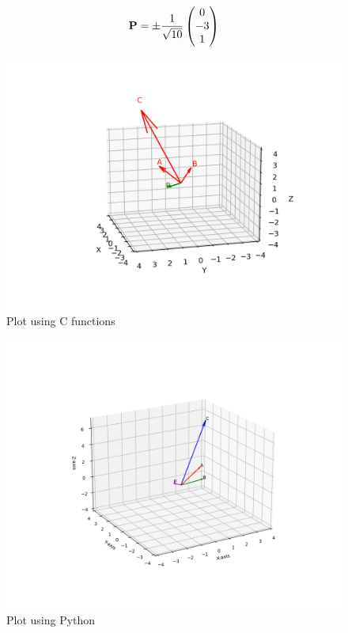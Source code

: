 \documentclass{beamer}
\numberwithin{equation}{section}
\begin{document}
\begin{align}
\mathbf{P} = \pm \frac{1}{\sqrt{10}}\begin{pmatrix}0\\-3\\1\end{pmatrix}
\end{align}\begin{figure}[H]
	\centering
	\includegraphics[scale=0.5]{img}
	\caption*{Plot using C functions}
	\label{img}
\end{figure}
\begin{figure}[H]
	\centering
	\includegraphics[scale=0.25]{fig}
	\caption*{Plot using Python}
	\label{fig}
\end{figure}
\end{document}
